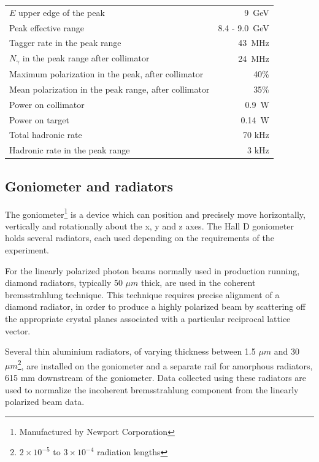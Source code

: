 \begin{table}[tbp]
\begin{center}
\begin{tabular}{|l|r|}
\hline\hline
$E$ upper edge of the peak & 9~GeV \\
Peak effective range       & 8.4 - 9.0~GeV\\
Tagger rate in the peak range & 43~MHz  \\
$N_{\gamma}$ in the peak range after collimator & 24~MHz  \\
Maximum polarization in the peak, after collimator & 40\% \\
Mean polarization in the peak range, after collimator & 35\% \\
Power on collimator & 0.9~W \\
Power on target & 0.14~W \\
Total hadronic rate & 70 kHz \\
Hadronic rate in the peak range & 3 kHz \\
\hline\hline
\end{tabular}
\end{center}
\end{table}


\subsection{Goniometer and radiators \label{sec:radiators}}
The goniometer\footnote{Manufactured by Newport Corporation} is a device which can position and precisely move horizontally, vertically and rotationally about the x, y and z axes.
The Hall D goniometer holds several radiators, each used depending on the requirements of the experiment.

For the linearly polarized photon beams normally used in \GX{} production running, diamond radiators, typically 50 $\mu m$ thick, are used in the coherent bremsstrahlung technique.
This technique requires precise alignment of a diamond radiator, in order to produce a highly polarized beam by scattering off the appropriate crystal planes associated with a particular reciprocal lattice vector.

Several thin aluminium radiators, of varying thickness between 1.5 $\mu m$ and 30 $\mu m$\footnote{$2\times10^{-5}$ to $3\times10^{-4}$ radiation lengths}, are installed on the goniometer and a separate rail for amorphous radiators, 615 mm downstream of the goniometer.
Data collected using these radiators are used to normalize the incoherent bremsstrahlung component from the linearly polarized beam data.


